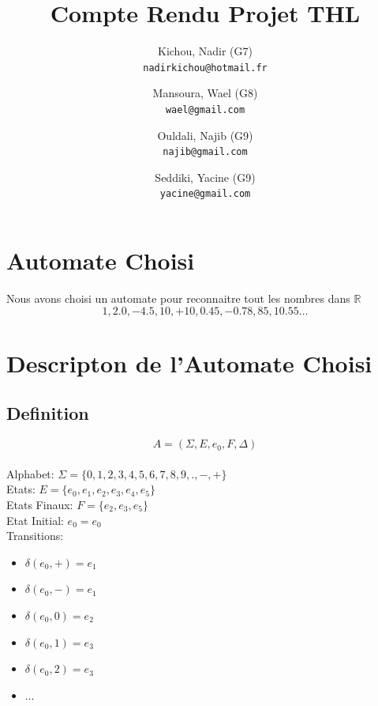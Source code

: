 \documentclass{article}
\title{Compte Rendu Projet THL}
\author{
  Kichou, Nadir (G7)\\
  \texttt{nadirkichou@hotmail.fr}
  \and
  Mansoura, Wael (G8)\\
  \texttt{wael@gmail.com}
   \and
  Ouldali, Najib (G9)\\
  \texttt{najib@gmail.com}
  \and
  Seddiki, Yacine (G9)\\
  \texttt{yacine@gmail.com}
}
\begin{document}
\maketitle

\pagebreak

\setcounter{tocdepth}{1} %

\tableofcontents

\pagebreak

\section{Automate Choisi}

Nous avons choisi un automate pour reconnaitre tout les nombres dans $\mathbb{R}$ $$1, 2.0, -4.5, 10, +10, 0.45, -0.78, 85, 10.55 \ldots$$

\section{Descripton de l'Automate Choisi}

\subsection{Definition}

$$A = (\Sigma, E, e_0, F, \Delta)$$\\
Alphabet: $\Sigma = \{0, 1, 2, 3, 4, 5, 6, 7, 8, 9, ., -, +\}$\\
Etats: $E = \{e_0, e_1, e_2, e_3, e_4, e_5\}$\\
Etats Finaux: $F = \{e_2, e_3, e_5\}$\\
Etat Initial: $e_0 = e_0$\\
Transitions:
\begin{multicols}{2}
\begin{itemize}
  \item \tab $\delta(e_0, +) = e_1$
  \item \tab $\delta(e_0, -) = e_1$
  \item \tab $\delta(e_0, 0) = e_2$
  \item \tab $\delta(e_0, 1) = e_3$
  \item \tab $\delta(e_0, 2) = e_3$
  \item \tab $\ldots$
\end{itemize}
\end{multicols}
\end{document}
